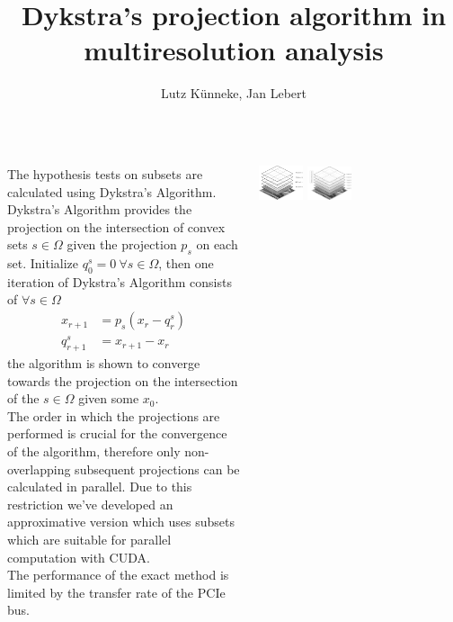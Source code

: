 \documentclass{tikzposter} %
\title{Dykstra's projection algorithm in multiresolution analysis}
\author{Lutz Künneke, Jan Lebert}
\institute{CUDA Lab Course 2014, Institut für Numerische und Angewandte Mathematik}
\begin{document}
\maketitle[width=0.85\linewidth]

\begin{columns}


	 {
	The hypothesis tests on subsets are calculated using Dykstra's Algorithm.
	Dykstra's Algorithm provides the projection on the intersection of convex sets $s \in \Omega$ given the projection $p_s$ on each set.
	Initialize $q_0^s = 0~\forall s \in \Omega$, then one iteration of Dykstra's Algorithm consists of $\forall s \in \Omega$
	\begin{align*} 
		x_{r+1} &= p_s \left( x_r - q_r^s \right) \\ 
		q_{r+1}^s &= x_{r+1} - x_r
	\end{align*}
	the algorithm is shown to converge towards the projection on the intersection of the $s \in \Omega$ given some $x_0$.\\
	The order in which the projections are performed is crucial for the convergence of the algorithm, therefore only non-overlapping 
	subsequent projections can be calculated in parallel. Due to this restriction we've developed an approximative version which uses
	subsets which are suitable for parallel computation with CUDA. \\
	The performance of the exact method is limited by the transfer rate of the PCIe bus.
	\begin{tikzfigure}
		\includegraphics[width=0.22\textwidth]{dykstra_crop.pdf}
		\includegraphics[width=0.22\textwidth]{dykstra_approx_crop.pdf}
	\end{tikzfigure}
	}


\end{columns}
\end{document}
